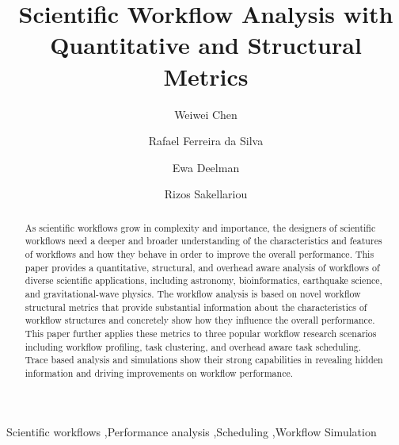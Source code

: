 \documentclass[final,5p,times,twocolumn]{elsarticle}
\begin{document}
\begin{frontmatter}


\title{Scientific Workflow Analysis with Quantitative and Structural Metrics}


\author[isi]{Weiwei Chen}

\author[isi]{Rafael Ferreira da Silva}

\author[isi]{Ewa Deelman}


\author[man]{Rizos Sakellariou}



\address[isi]{University of Southern California, Information Sciences Institute, Marina del Rey, CA, USA}
\address[man]{University of Manchester, School of Computer Science, Manchester, U.K.}


\begin{abstract}
As scientific workflows grow in complexity and importance, the designers of scientific workflows need a deeper and broader understanding of the characteristics and features of workflows and how they behave in order to improve the overall performance. 
This paper provides a quantitative, structural, and overhead aware analysis of workflows of diverse scientific applications, including astronomy, bioinformatics, earthquake science, and gravitational-wave physics. The workflow analysis is based on novel workflow structural metrics that provide substantial information about the characteristics of workflow structures and concretely show how they influence the overall performance. 
This paper further applies these metrics to three popular workflow research scenarios including workflow profiling, task clustering, and overhead aware task scheduling. Trace based analysis and simulations show their strong capabilities in revealing hidden information and driving improvements on workflow performance. 

\end{abstract}

\begin{keyword}
Scientific workflows \sep Performance analysis \sep Scheduling \sep Workflow Simulation
\end{keyword}

\end{frontmatter}
\end{document}
